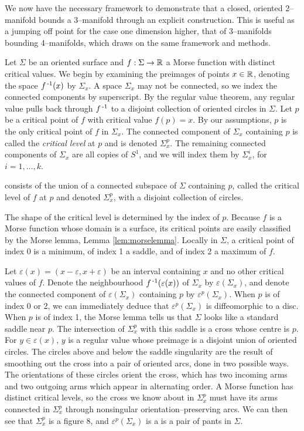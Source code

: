 \label{sec:2bound3}

We now have the necessary framework to demonstrate that a closed, oriented 2--manifold bounds a 3--manifold through an explicit construction.
This is useful as a jumping off point for the case one dimension higher, that of 3--manifolds bounding 4--manifolds, which draws on the same framework and methods.

Let $\Sigma$ be an oriented surface and $f:\Sigma\to\mathbb{R}$ a Morse function with distinct critical values.
We begin by examining the preimages of points $x\in\mathbb{R}$, denoting the space $f^{\,\text{-}1}(x)$ by $\Sigma_x$.
A space $\Sigma_x$ may not be connected, so we index the connected components by superscript.
By the regular value theorem, any regular value pulls back through $f^{\,\text{-}1}$ to a disjoint collection of oriented circles in $\Sigma$.
Let $p$ be a critical point of $f$ with critical value $f(p)=x$.
By our assumptions, $p$ is the only critical point of $f$ in $\Sigma_x$.
The connected component of $\Sigma_x$ containing $p$ is called the \emph{critical level} at $p$ and is denoted $\Sigma_x^p$.
The remaining connected components of $\Sigma_x$ are all copies of $S^1$, and we will index them by $\Sigma_x^i$, for $i=1,\dots,k$.

consists of the union of a connected subspace of $\Sigma$ containing $p$, called the critical level of $f$ at $p$ and denoted $\Sigma_x^p$, with a disjoint collection of circles.

The shape of the critical level is determined by the index of $p$.
Because $f$ is a Morse function whose domain is a surface, its critical points are easily classified by the Morse lemma, Lemma \ref{lem:morselemma}.
Locally in $\Sigma$, a critical point of index 0 is a minimum, of index 1 a saddle, and of index 2 a maximum of $f$.

Let $\varepsilon(x)=(x-\varepsilon,x+\varepsilon)$ be an interval containing $x$ and no other critical values of $f$.
Denote the neighbourhood $f^{\,\text{-}1}(\varepsilon(x))$ of $\Sigma_x$ by $\varepsilon(\Sigma_x)$, and denote the connected component of $\varepsilon(\Sigma_x)$ containing $p$ by $\varepsilon^p(\Sigma_x)$.
When $p$ is of index 0 or 2, we can immediately deduce that $\varepsilon^p(\Sigma_x)$ is diffeomorphic to a disc.
When $p$ is of index 1, the Morse lemma tells us that $\Sigma$ looks like a standard saddle near $p$.
The intersection of $\Sigma_x^p$ with this saddle is a cross whose centre is $p$.
For $y\in\varepsilon(x)$, $y$ is a regular value whose preimage is a disjoint union of oriented circles.
The circles above and below the saddle singularity are the result of smoothing out the cross into a pair of oriented arcs, done in two possible ways.
The orientations of these circles orient the cross, which has two incoming arms and two outgoing arms which appear in alternating order.
A Morse function has distinct critical levels, so the cross we know about in $\Sigma_x^p$ must have its arms connected in $\Sigma_x^p$ through nonsingular orientation--preserving arcs.
We can then see that $\Sigma_x^p$ is a figure 8, and $\varepsilon^p(\Sigma_x)$ is a is a pair of pants in $\Sigma$.

